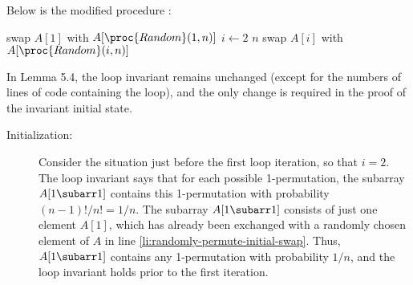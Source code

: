 Below is the modified procedure :

\begin{codebox}
\li swap $A[1]$ with $A[\proc{Random}(1,n)]$ \label{li:randomly-permute-initial-swap}
\li \For $i\gets2$ \To $n$
\li     \Do swap $A[i]$ with $A[\proc{Random}(i,n)]$
        \End
\end{codebox}

In Lemma 5.4, the loop invariant remains unchanged (except for the numbers of lines of code containing the  loop), and the only change is required in the proof of the invariant initial state.

\begin{description}
    \item[Initialization:] Consider the situation just before the first loop iteration, so that $i=2$.
    The loop invariant says that for each possible 1-permutation, the subarray $A[1\subarr1]$ contains this 1-permutation with probability $(n-1)!/n!=1/n$.
    The subarray $A[1\subarr1]$ consists of just one element $A[1]$, which has already been exchanged with a randomly chosen element of $A$ in line \ref{li:randomly-permute-initial-swap}.
    Thus, $A[1\subarr1]$ contains any 1-permutation with probability $1/n$, and the loop invariant holds prior to the first iteration.
\end{description}
